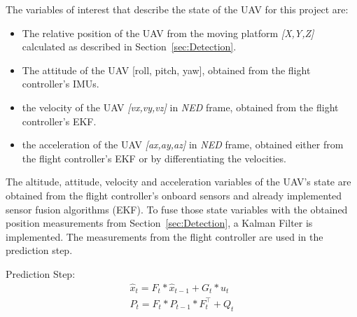\documentclass[conference]{IEEEtran}
\begin{document}
The variables of interest that describe the state of the UAV for this project are:
%
\begin{itemize}

\item The relative position of the UAV from the moving platform \emph{[X,Y,Z]} calculated as described in Section~\ref{sec:Detection}.

\item The attitude of the UAV [roll, pitch, yaw], obtained from the flight controller's IMUs.

\item the velocity of the UAV \emph{[vx,vy,vz]} in \emph{NED} frame, obtained from the flight controller's EKF.


\item the acceleration of the UAV \emph{[ax,ay,az]} in \emph{NED} frame, obtained either from the flight controller's EKF or by differentiating the velocities.



\end{itemize}
%
The altitude, attitude, velocity and acceleration variables of the
UAV's state are obtained from the flight controller's onboard sensors
and already implemented sensor fusion algorithms (EKF). To fuse those
state variables with the obtained position measurements from
Section~\ref{sec:Detection}, a Kalman Filter is implemented. The
measurements from the flight controller are used in the prediction
step.


Prediction Step:
\begin{equation} 
 \begin{array}{l}
    \hat{x}_{t} = F_{t} * \hat{x}_{t-1} + G_{t} *u_{t} \\ 
    P_{t} = F_{t}* P_{t-1} * F_{t}^\top + Q_{t}
  \end{array}
\end{equation}
\end{document}
